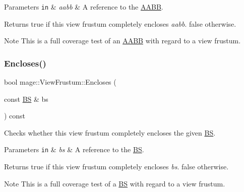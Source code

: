 \begin{DoxyParams}[1]{Parameters}
\mbox{\tt in}  & {\em aabb} & A reference to the \hyperlink{structmage_1_1_a_a_b_b}{A\+A\+BB}. \\
\hline
\end{DoxyParams}
\begin{DoxyReturn}{Returns}
{\ttfamily true} if this view frustum completely encloses {\itshape aabb}. {\ttfamily false} otherwise. 
\end{DoxyReturn}
\begin{DoxyNote}{Note}
This is a full coverage test of an \hyperlink{structmage_1_1_a_a_b_b}{A\+A\+BB} with regard to a view frustum. 
\end{DoxyNote}
\hypertarget{structmage_1_1_view_frustum_a779328d61928c60bfc0290d85eb79e4c}{}\label{structmage_1_1_view_frustum_a779328d61928c60bfc0290d85eb79e4c} 
\subsubsection{\texorpdfstring{Encloses()}{Encloses()}\hspace{0.1cm}{\footnotesize\ttfamily [4/4]}}
{\footnotesize\ttfamily bool mage\+::\+View\+Frustum\+::\+Encloses (\begin{DoxyParamCaption}\item[{const \hyperlink{structmage_1_1_b_s}{BS} \&}]{bs }\end{DoxyParamCaption}) const\hspace{0.3cm}{\ttfamily [noexcept]}}

Checks whether this view frustum completely encloses the given \hyperlink{structmage_1_1_b_s}{BS}.


\begin{DoxyParams}[1]{Parameters}
\mbox{\tt in}  & {\em bs} & A reference to the \hyperlink{structmage_1_1_b_s}{BS}. \\
\hline
\end{DoxyParams}
\begin{DoxyReturn}{Returns}
{\ttfamily true} if this view frustum completely encloses {\itshape bs}. {\ttfamily false} otherwise. 
\end{DoxyReturn}
\begin{DoxyNote}{Note}
This is a full coverage test of a \hyperlink{structmage_1_1_b_s}{BS} with regard to a view frustum. 
\end{DoxyNote}
\hypertarget{structmage_1_1_view_frustum_ab0df90a890172361fb520d4527d81546}{}\label{structmage_1_1_view_frustum_ab0df90a890172361fb520d4527d81546} 
